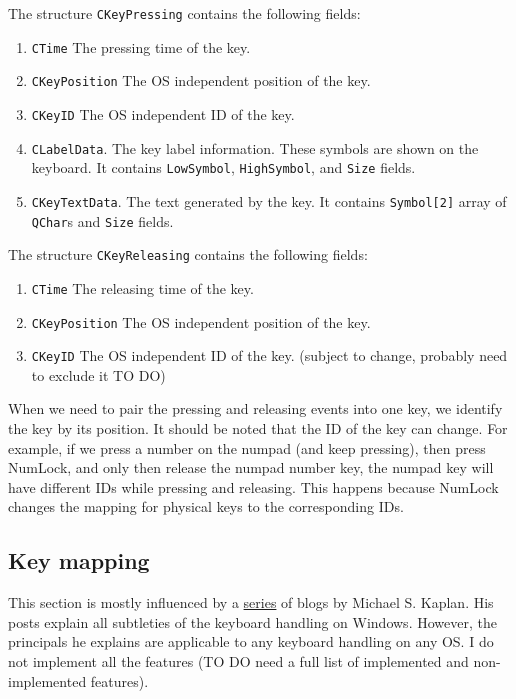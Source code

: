\documentclass{article}
\begin{document}
The structure \verb"CKeyPressing" contains the following fields:
\begin{enumerate}
\item \verb"CTime" The pressing time of the key.
\item \verb"CKeyPosition" The OS independent position of the key.
\item \verb"CKeyID" The OS independent ID of the key.
\item \verb"CLabelData". The key label information. These symbols are shown on the keyboard. It contains \verb"LowSymbol", \verb"HighSymbol", and \verb"Size" fields.
\item \verb"CKeyTextData". The text generated by the key. It contains \verb"Symbol[2]" array of \verb"QChar"s and \verb"Size" fields.
\end{enumerate}

The structure \verb"CKeyReleasing" contains the following fields:
\begin{enumerate}
\item \verb"CTime" The releasing time of the key.
\item \verb"CKeyPosition" The OS independent position of the key.
\item \verb"CKeyID" The OS independent ID of the key. (subject to change, probably need to exclude it TO DO)
\end{enumerate}

When we need to pair the pressing and releasing events into one key, we identify the key by its position. It should be noted that the ID of the key can change. For example, if we press a number on the numpad (and keep pressing), then press NumLock, and only then release the numpad number key, the numpad key will have different IDs while pressing and releasing. This happens because NumLock changes the mapping for physical keys to the corresponding IDs.

\subsection{Key mapping}

This section is mostly influenced by a \href{http://archives.miloush.net/michkap/archive/2006/03/23/558658.html}{series} of blogs by Michael S. Kaplan. His posts explain all subtleties of the keyboard handling on Windows. However, the principals he explains are applicable to any keyboard handling on any OS. I do not implement all the features (TO DO need a full list of implemented and non-implemented features).
\end{document}
